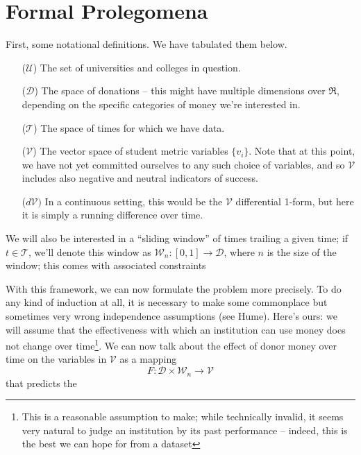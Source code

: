 \documentclass[paper.tex]{subfiles}
\newcommand{\U}{\mathcal{U}}
\newcommand{\D}{\mathcal{D}}
\newcommand{\V}{\mathcal{V}}
\newcommand{\T}{\mathcal{T}}
\newcommand{\W}{\mathcal{W}}
\begin{document}
	\section{Formal Prolegomena}
	
	First, some notational definitions. We have tabulated them below. 
	
	\begin{itemize}
		\item[($\U$)] The set of universities and colleges in question.
		\item[($\D$)] The space of donations -- this might have multiple dimensions over $\Re$, depending on the specific categories of money we're interested in. 
		\item[($\T$)] The space of times for which we have data. 
		\item[($\V$)] The vector space of student metric variables $\{v_i\}$. Note that at this point, we have not yet committed ourselves to any such choice of variables, and so $\V$ includes also negative and neutral indicators of success.
		\item[($d\V)$] In a continuous setting, this would be the $\V$ differential 1-form, but here it is simply a running difference over time.  
	\end{itemize}
	
	We will also be interested in a ``sliding window'' of times trailing a given time; if $t \in \T$, we'll denote this window as $\W_n : [0,1] \to \D$, where $n$ is the size of the window; this comes with associated constraints 
	
	With this framework, we can now formulate the problem more precisely. To do any kind of induction at all, it is necessary to make some commonplace but sometimes very wrong independence assumptions (see Hume). Here's ours: we will assume that the effectiveness with which an institution can use money does not change over time\footnote{This is a reasonable assumption to make; while technically invalid, it seems very natural to judge an institution by its past performance -- indeed, this is the best we can hope for from a dataset}. We can now talk about the effect of donor money over time on the variables in $\V$ as a mapping
	\begin{equation}
		F: \D \times \W_n \to \V
	\end{equation} 	
	that predicts the 
\end{document}
